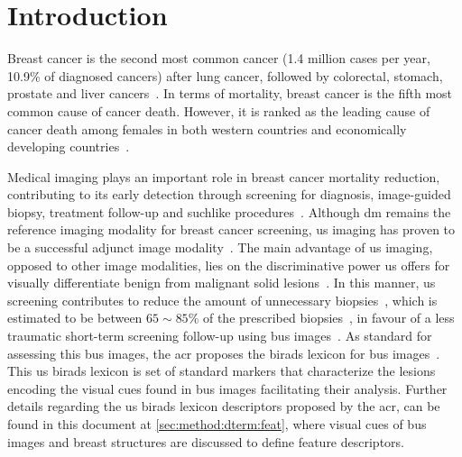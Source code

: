 \graphicspath{ {./content/intro/figures/} }

\section{Introduction}
\label{sec:intro}  %


Breast cancer is the second most common cancer (1.4 million cases per year, 10.9\% of  diagnosed cancers) after lung cancer, followed by colorectal, stomach, prostate and liver cancers~\cite{Ferlay2010}.
In terms of mortality, breast cancer is the fifth most common cause of cancer death.
However, it is ranked as the leading cause of cancer death among females in both western countries and economically developing countries~\cite{cancerStatistics2011}.

Medical imaging plays an important role in breast cancer mortality reduction, contributing to its early detection through screening for diagnosis, image-guided biopsy, treatment follow-up and suchlike procedures~\cite{smith2003american}.
Although \ac{dm} remains the reference imaging modality for breast cancer screening, \ac{us} imaging has proven to be a successful adjunct image modality~\cite{smith2003american,berg2004diagnostic}.
The main advantage of \ac{us} imaging, opposed to other image modalities, lies on the discriminative power \ac{us} offers for visually differentiate benign from malignant solid lesions~\cite{Stavros:1995p12392}.
In this manner, \ac{us} screening contributes to reduce the amount of unnecessary biopsies~\cite{ciatto1994contribution}, which is estimated to be between $65\sim85\%$ of the prescribed biopsies~\cite{yuan2010multimodality}, in favour of a less traumatic short-term screening follow-up using \ac{bus} images~\cite{gordon1995malignant}.
As standard for assessing this \ac{bus} images, the \ac{acr} proposes the \ac{birads} lexicon for \ac{bus} images~\cite{biradsus}.
This \ac{us} \ac{birads} lexicon is set of standard markers that characterize the lesions encoding the visual cues found in \ac{bus} images facilitating their analysis.
Further details regarding the \ac{us} \ac{birads} lexicon descriptors proposed by the \ac{acr}, can be found in this document at \cref{sec:method:dterm:feat}, where visual cues of \ac{bus} images and breast structures are discussed to define feature descriptors.

